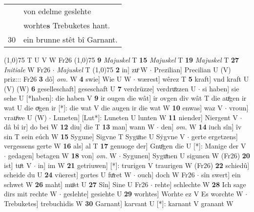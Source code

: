 \documentclass[8pt,a4paper,notitlepage]{article}
\begin{document}
\begin{table}[ht]
\begin{minipage}[t]{0.5\linewidth}
\begin{tabular}{rl}
 & von edelme geslehte\\ 
 & worhte\textbf{s} Trebuketes hant.\\ 
30 & ein brunne stêt bî Garnant.\\ 
\end{tabular}
\scriptsize
\line(1,0){75} \newline
T U V W Fr26 \newline
\line(1,0){75} \newline
\textbf{9} \textit{Majuskel} T  \textbf{15} \textit{Majuskel} T  \textbf{19} \textit{Majuskel} T  \textbf{27} \textit{Initiale} W Fr26   $\cdot$ \textit{Majuskel} T  \newline
\line(1,0){75} \newline
\textbf{2} in] zuͦ W  $\cdot$ Prezilian] Precilian U (V) priz::: Fr26 \textbf{3} dô] \textit{om.} W \textbf{4} swie] Wie U W  $\cdot$ wærest] wêrez T \textbf{5} kraft] vnd kraft U (V) (W) \textbf{6} geselleschaft] geseschaft U \textbf{7} verdrüzze] verdruͦzzen U  $\cdot$ si haben] sie sehe U [*haben]: die haben V \textbf{9} ir ougen die wât] ir ovgen div wât T die auͦgen ir wat U die oͮgen ir [*]: die wat V die augen ir die wat W \textbf{10} enwas] waz V  $\cdot$ vroun] vrauͦwe U (W)  $\cdot$ Luneten] [Lut*]: Luneten U lunten W \textbf{11} niender] Niergent V  $\cdot$ dâ bî ir] do bei W \textbf{12} diu] die T \textbf{13} man] wann W  $\cdot$ den] \textit{om.} W \textbf{14} iuch sîn] îv sin T sein eúch W \textbf{15} Sygune] Sigvne T Syguͦne U Sẏgvne V  $\cdot$ gerte ergetzens] vergessens gerte W \textbf{16} als] al T \textbf{17} genuoge der] Gnuͦgen die U [*]: Manige der V  $\cdot$ gedagen] betagen W \textbf{18} von] \textit{om.} W  $\cdot$ Sygunen] Syguͦnen U sigunen W (Fr26) \textbf{20} ist] tuͦt V  $\cdot$ in] im W \textbf{21} getriuwen] [*]: trurigen V traurigen W (Fr26) \textbf{22} schiedû] scheide du U \textbf{24} vüerest] gortes U fuͤret W  $\cdot$ ouch] doch W Fr26  $\cdot$ sîn swert] ein schwet W \textbf{26} maht] muͦst U \textbf{27} Sîn] Sine U Fr26  $\cdot$ rehte] schlechte W \textbf{28} Ich sage dirs mit rechte W  $\cdot$ geslehte] gesiehte U \textbf{29} worhtes] Worhte ez V Es worchte W  $\cdot$ Trebuketes] trebuchidis W \textbf{30} Garnant] karvant U [*]: karnant V granant W \newline
\end{minipage}
\end{table}
\end{document}

